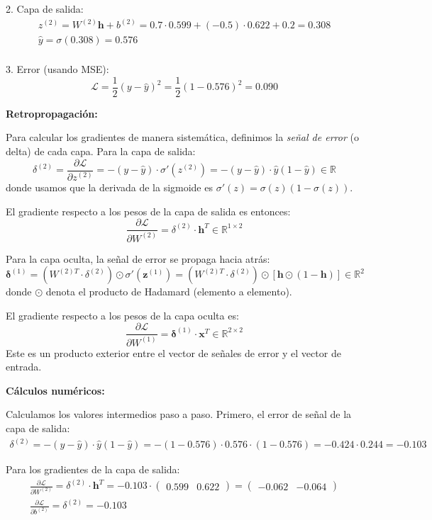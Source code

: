 2. Capa de salida:
\begin{gather*}
    z^{(2)} = W^{(2)}\mathbf{h} + b^{(2)} = 0.7 \cdot 0.599 + (-0.5) \cdot 0.622 + 0.2 = 0.308\\
    \hat{y} = \sigma(0.308) = 0.576\\
\end{gather*}

3. Error (usando \gls{MSE}):
\[
	\mathcal{L} = \frac{1}{2}(y - \hat{y})^2 = \frac{1}{2}(1 - 0.576)^2 = 0.090
\]

\textbf{Retropropagación:}

Para calcular los gradientes de manera sistemática, definimos la \textit{señal de error} (o delta) de cada capa. Para la capa de salida:
\[
	\delta^{(2)} = \frac{\partial \mathcal{L}}{\partial z^{(2)}} = -(y - \hat{y}) \cdot \sigma'(z^{(2)}) = -(y - \hat{y}) \cdot \hat{y}(1 - \hat{y}) \in \mathbb{R}
\]
donde usamos que la derivada de la sigmoide es \(\sigma'(z) = \sigma(z)(1-\sigma(z))\).

El gradiente respecto a los pesos de la capa de salida es entonces:
\[
	\frac{\partial \mathcal{L}}{\partial W^{(2)}} = \delta^{(2)} \cdot \mathbf{h}^T \in \mathbb{R}^{1 \times 2}
\]

Para la capa oculta, la señal de error se propaga hacia atrás:
\[
	\boldsymbol{\delta}^{(1)} = \left( W^{(2)T} \cdot \delta^{(2)} \right) \odot \sigma'(\mathbf{z}^{(1)}) = \left( W^{(2)T} \cdot \delta^{(2)} \right) \odot \left[ \mathbf{h} \odot (1 - \mathbf{h}) \right] \in \mathbb{R}^{2}
\]
donde \(\odot\) denota el producto de Hadamard (elemento a elemento).

El gradiente respecto a los pesos de la capa oculta es:
\[
	\frac{\partial \mathcal{L}}{\partial W^{(1)}} = \boldsymbol{\delta}^{(1)} \cdot \mathbf{x}^T \in \mathbb{R}^{2 \times 2}
\]
Este es un producto exterior entre el vector de señales de error y el vector de entrada.

\textbf{Cálculos numéricos:}

Calculamos los valores intermedios paso a paso. Primero, el error de señal de la capa de salida:
\begin{gather*}
	\delta^{(2)} = -(y - \hat{y}) \cdot \hat{y}(1 - \hat{y}) = -(1 - 0.576) \cdot 0.576 \cdot (1 - 0.576) = -0.424 \cdot 0.244 = -0.103
\end{gather*}

Para los gradientes de la capa de salida:
\begin{gather*}
	\frac{\partial \mathcal{L}}{\partial W^{(2)}} = \delta^{(2)} \cdot \mathbf{h}^T = -0.103 \cdot \begin{pmatrix} 0.599 & 0.622 \end{pmatrix} = \begin{pmatrix} -0.062 & -0.064 \end{pmatrix} \\[0.3em]
	\frac{\partial \mathcal{L}}{\partial b^{(2)}} = \delta^{(2)} = -0.103
\end{gather*}

